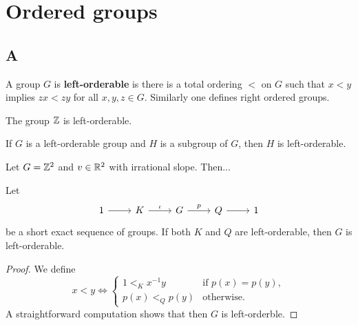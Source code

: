 \chapter{Ordered groups}
\label{ordered}



\section*{A}

A group $G$ is \textbf{left-orderable} is there is a total ordering $<$ on $G$ 
such that $x<y$ implies $zx<zy$ for all $x,y,z\in G$. Similarly one
defines right ordered groups. 

\begin{example}
The group $\mathbb{Z}$ is left-orderable. 
\end{example}

\begin{example}
	If $G$ is a left-orderable group and $H$ is a subgroup of $G$, then $H$ is left-orderable.
\end{example}

\begin{example}
	Let $G=\mathbb{Z}^2$ and $v\in\mathbb{R}^2$ with irrational slope. Then...
\end{example}

\begin{proposition}
Let 
\[
\begin{tikzcd}
	1 & K & G & Q & 1
	\arrow[from=1-1, to=1-2]
	\arrow["\iota", from=1-2, to=1-3]
	\arrow["p", from=1-3, to=1-4]
	\arrow[from=1-4, to=1-5]
\end{tikzcd}
\]
be a short exact sequence of groups. 
If both $K$ and $Q$ are left-orderable, then $G$ is left-orderable. 
\end{proposition}

\begin{proof}
	We define 
	\[
	x<y\Longleftrightarrow
	\begin{cases}
		1<_Kx^{-1}y & \text{if $p(x)=p(y)$},\\
		p(x)<_Qp(y) & \text{otherwise}.		
	\end{cases}
	\]
	A straightforward computation shows that then $G$ is left-orderble. 
\end{proof}

